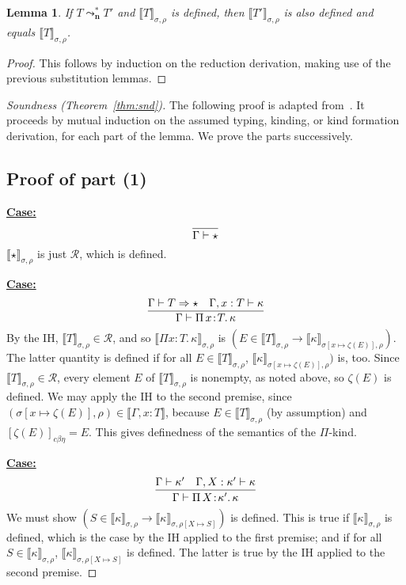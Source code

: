 \documentclass{article}
\newcommand{\choice}[0]{\zeta}
\newcommand{\abs}[4]{{#1}\, #2\! : \! #3.\, #4}
\newcommand{\interp}[1]{\llbracket #1 \rrbracket}
\newcommand{\leadstocs}[0]{\ensuremath{\leadsto_{\mathbf{n}}^*}}
\newcommand{\tpsynth}[0]{\Rightarrow}
\newcommand{\cbe}[0]{c\beta\eta}
\newcommand{\startcase}[1]{\vspace{#1} \noindent\textbf{\underline{Case:}}}
\newtheorem{lemma}[theorem]{Lemma}
\begin{document}
\begin{lemma}
  \label{lem:interppres}
  If $T \leadstocs T'$ and $\interp{T}_{\sigma,\rho}$ is defined, then $\interp{T'}_{\sigma,\rho}$ is also defined and equals $\interp{T}_{\sigma,\rho}$.
\end{lemma}
\begin{proof}
  This follows by induction on the reduction derivation, making use of the previous substitution lemmas.
\end{proof}

\begin{proof}[Soundness (Theorem~\ref{thm:snd})]
  The following proof is adapted from~\cite{stump17}.  It proceeds by
  mutual induction on the assumed typing, kinding, or kind formation
  derivation, for each part of the lemma.  We prove the parts
  successively.  

\subsection{Proof of part (1)}

\startcase{.2cm}
\[
\infer{\Gamma \vdash \star }{\ }
\]
$\interp{\star}_{\sigma,\rho}$ is just $\mathcal{R}$, which is
defined.  

\startcase{.2cm}
\[
    \infer{\Gamma\vdash\abs{\Pi}{x}{T}{\kappa}}{\Gamma \vdash T \tpsynth \star & \Gamma,x:T\vdash\kappa} 
\]
By the IH, $\interp{T}_{\sigma,\rho}\in\mathcal{R}$, and so
$\interp{\Pi x : T.\, \kappa}_{\sigma,\rho}$ is
$(E\in\interp{T}_{\sigma,\rho} \to \interp{\kappa}_{\sigma[x\mapsto  \choice(E)],\rho})$.
The latter quantity is defined if for all
$E\in\interp{T}_{\sigma,\rho}$, $\interp{\kappa}_{\sigma[x\mapsto \choice(E)],\rho})$ is, too.  Since
$\interp{T}_{\sigma,\rho}\in\mathcal{R}$, every element $E$ of
$\interp{T}_{\sigma,\rho}$ is nonempty, as noted above, 
so $\choice(E)$ is defined.  We may apply the IH to the second
premise, since
$(\sigma[x\mapsto\choice(E)],\rho)\in\interp{\Gamma,x:T}$, because $E\in\interp{T}_{\sigma,\rho}$ (by assumption)
and $[\choice(E)]_{\cbe} = E$.  This gives definedness of the semantics
of the $\Pi$-kind.

\startcase{.2cm}
\[
   \infer{\Gamma\vdash\abs{\Pi}{X}{\kappa'}{\kappa}}{\Gamma \vdash \kappa' & \Gamma,X:\kappa'\vdash\kappa}
\]
We must show $(S\in\interp{\kappa}_{\sigma,\rho} \to \interp{\kappa}_{\sigma,\rho[X\mapsto S]})$ is defined.
This is true if $\interp{\kappa}_{\sigma,\rho}$ is defined, which is the case by
the IH applied to the first premise; and if for all
$S\in\interp{\kappa}_{\sigma,\rho}$,
$\interp{\kappa}_{\sigma,\rho[X\mapsto S]}$ is defined.  The latter is
true by the IH applied to the second premise.  


\end{proof}
\end{document}
